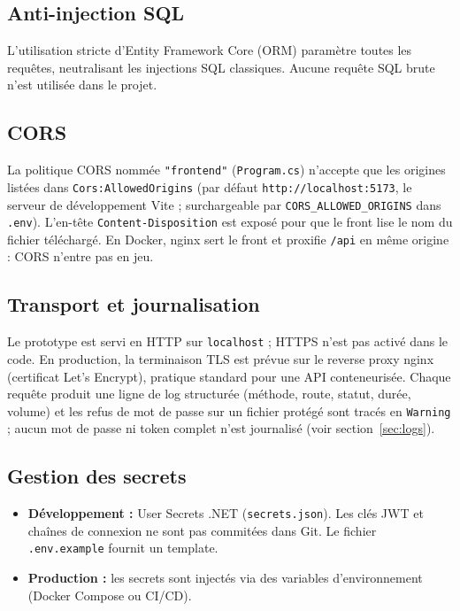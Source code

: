 \documentclass[12pt,a4paper]{article}
\begin{document}
\subsection{Anti-injection SQL}

L'utilisation stricte d'Entity Framework Core (ORM) param\`etre toutes les requ\^etes, neutralisant les injections SQL classiques. Aucune requ\^ete SQL brute n'est utilis\'ee dans le projet.

\subsection{CORS}

La politique CORS nomm\'ee \texttt{"frontend"} (\texttt{Program.cs}) n'accepte que les origines list\'ees dans \texttt{Cors:AllowedOrigins} (par d\'efaut \texttt{http://localhost:5173}, le serveur de d\'eveloppement Vite ; surchargeable par \texttt{CORS\_ALLOWED\_ORIGINS} dans \texttt{.env}). L'en-t\^ete \texttt{Content-Disposition} est expos\'e pour que le front lise le nom du fichier t\'el\'echarg\'e. En Docker, nginx sert le front et proxifie \texttt{/api} en m\^eme origine : CORS n'entre pas en jeu.

\subsection{Transport et journalisation}

Le prototype est servi en HTTP sur \texttt{localhost} ; HTTPS n'est pas activ\'e dans le code. En production, la terminaison TLS est pr\'evue sur le reverse proxy nginx (certificat Let's Encrypt), pratique standard pour une API conteneuris\'ee. Chaque requ\^ete produit une ligne de log structur\'ee (m\'ethode, route, statut, dur\'ee, volume) et les refus de mot de passe sur un fichier prot\'eg\'e sont trac\'es en \texttt{Warning} ; aucun mot de passe ni token complet n'est journalis\'e (voir section~\ref{sec:logs}).

\subsection{Gestion des secrets}

\begin{itemize}[nosep]
  \item \textbf{D\'eveloppement :} User Secrets .NET (\texttt{secrets.json}). Les cl\'es JWT et cha\^ines de connexion ne sont pas commit\'ees dans Git. Le fichier \texttt{.env.example} fournit un template.
  \item \textbf{Production :} les secrets sont inject\'es via des variables d'environnement (Docker Compose ou CI/CD).
\end{itemize}
\end{document}
